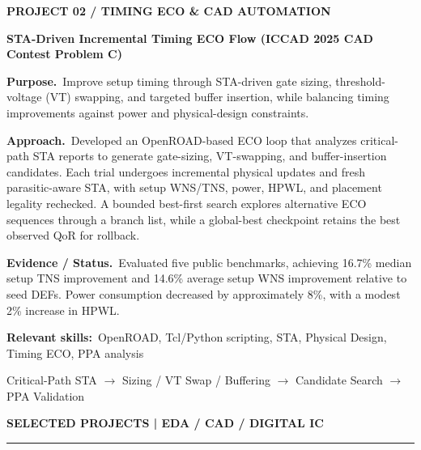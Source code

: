 \documentclass[a4paper,11pt]{article}
\newcommand{\smallhead}[1]{%
  {\footnotesize\bfseries\color{muted} #1}\par\vspace{4pt}
  \color{rulecol}\rule{\linewidth}{0.8pt}\color{ink}\vspace{10pt}}
\newcommand{\project}[6]{%
  {\small\color{muted}\bfseries #1}\par\vspace{3pt}
  {\fontsize{12}{14}\selectfont\bfseries #2}\par\vspace{7pt}
  {\small\textbf{Purpose.}\ #3}\par\vspace{5pt}
  {\small\textbf{Approach.}\ #4}\par\vspace{5pt}
  {\small\textbf{Evidence / Status.}\ #5}\par\vspace{5pt}
  {\footnotesize\textbf{Relevant skills:}\ #6}\par\vspace{8pt}}
\newcommand{\flowline}[1]{%
  \noindent\colorbox{shade}{%
    \parbox{\dimexpr\linewidth-2\fboxsep}{\centering\footnotesize\color{muted} #1}}
  \par\vspace{12pt}}
\begin{document}
\project{PROJECT 02 \quad / \quad TIMING ECO \& CAD AUTOMATION}
{STA-Driven Incremental Timing ECO Flow (ICCAD 2025 CAD Contest Problem C)}
{Improve setup timing through STA-driven gate sizing, threshold-voltage (VT) swapping, and targeted buffer insertion, while balancing timing improvements against power and physical-design constraints.}
{Developed an OpenROAD-based ECO loop that analyzes critical-path STA reports to generate gate-sizing, VT-swapping, and buffer-insertion candidates. Each trial undergoes incremental physical updates and fresh parasitic-aware STA, with setup WNS/TNS, power, HPWL, and placement legality rechecked. A bounded best-first search explores alternative ECO sequences through a branch list, while a global-best checkpoint retains the best observed QoR for rollback.}
{Evaluated five public benchmarks, achieving 16.7\% median
setup TNS improvement and 14.6\% average setup WNS
improvement relative to seed DEFs. Power consumption
decreased by approximately 8\%, with a modest 2\%
increase in HPWL.}
{OpenROAD, Tcl/Python scripting, STA, Physical Design, Timing ECO, PPA analysis}
\flowline{Critical-Path STA $\longrightarrow$ Sizing / VT Swap / Buffering $\longrightarrow$ Candidate Search $\longrightarrow$ PPA Validation}

\newpage
\smallhead{SELECTED PROJECTS \quad | \quad EDA / CAD / DIGITAL IC}
\end{document}
